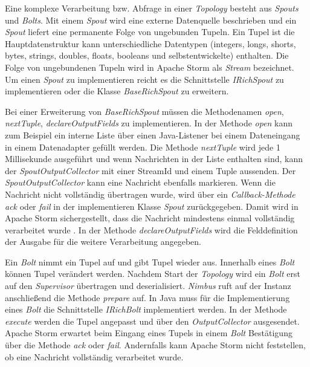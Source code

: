Eine komplexe Verarbeitung bzw. Abfrage in einer \textit{Topology} besteht aus \textit{Spouts} und \textit{Bolts}. Mit einem \textit{Spout} wird eine externe Datenquelle beschrieben und ein \textit{Spout} liefert eine permanente Folge von ungebunden Tupeln. Ein Tupel ist die Hauptdatenstruktur kann unterschiedliche Datentypen (integers, longs, shorts, bytes, strings, doubles, floats, booleans und selbstentwickelte) enthalten. Die Folge von ungebundenen Tupeln wird in Apache Storm als \textit{Stream} bezeichnet. Um einen \textit{Spout} zu implementieren reicht es die Schnittstelle \textit{IRichSpout} zu implementieren oder die Klasse \textit{BaseRichSpout} zu erweitern. 

Bei einer Erweiterung von \textit{BaseRichSpout} müssen die Methodenamen \textit{open}, \textit{nextTuple}, \textit{declareOutputFields} zu implementieren. In der Methode \textit{open} kann zum Beispiel ein interne Liste über einen Java-Listener bei einem Dateneingang in einem Datenadapter gefüllt werden. Die Methode \textit{nextTuple} wird jede 1 Millisekunde ausgeführt und wenn Nachrichten in der Liste enthalten sind, kann der \textit{SpoutOutputCollector} mit einer StreamId und einem Tuple aussenden. Der \textit{SpoutOutputCollector} kann eine Nachricht ebenfalls markieren. Wenn die Nachricht nicht vollständig übertragen wurde, wird über ein \textit{Callback-Methode} \textit{ack} oder \textit{fail} in der implementieren Klasse \textit{Spout} zurückgegeben. Damit wird in Apache Storm sichergestellt, dass die Nachricht mindestens einmal vollständig verarbeitet wurde . In der Methode \textit{declareOutputFields} wird die Felddefinition der Ausgabe für die weitere Verarbeitung angegeben. 

Ein \textit{Bolt} nimmt ein Tupel auf und gibt Tupel wieder aus. Innerhalb eines \textit{Bolt} können Tupel verändert werden. Nachdem Start der \textit{Topology} wird ein \textit{Bolt} erst auf den \textit{Supervisor} übertragen und deserialisiert. \textit{Nimbus} ruft auf der Instanz anschließend die Methode \textit{prepare} auf. In Java muss für die Implementierung eines \textit{Bolt} die Schnittstelle \textit{IRichBolt} implementiert werden. In der Methode \textit{execute} werden die Tupel angepasst und über den \textit{OutputCollector} ausgesendet. Apache Storm erwartet beim Eingang eines Tupels in einem \textit{Bolt} Bestätigung über die Methode \textit{ack} oder \textit{fail}. Andernfalls kann Apache Storm nicht feststellen, ob eine Nachricht vollständig verarbeitet wurde. 

